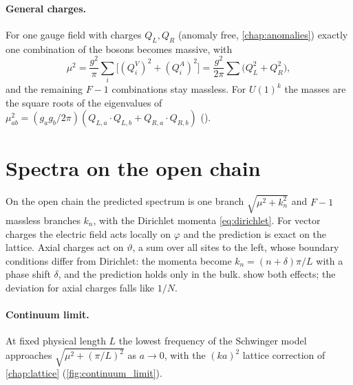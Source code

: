 \paragraph{General charges.} For one gauge field with charges $Q_L,Q_R$ (anomaly free, \cref{chap:anomalies})
exactly one combination of the bosons becomes massive, with
\begin{equation}\label{eq:meson-mass}
  \mu^2 = \frac{g^2}{\pi}\sum_i\bigl[(Q^V_i)^2 + (Q^A_i)^2\bigr] = \frac{g^2}{2\pi}\sum\bigl(Q_L^2 + Q_R^2\bigr),
\end{equation}
and the remaining $F-1$ combinations stay massless. For $U(1)^k$ the masses are the square roots of the
eigenvalues of $\mu^2_{ab} = (g_ag_b/2\pi)(Q_{L,a}\cdot Q_{L,b} + Q_{R,a}\cdot Q_{R,b})$
().

\section{Spectra on the open chain}
On the open chain the predicted spectrum is one branch $\sqrt{\mu^2 + k_n^2}$ and $F-1$ massless branches $k_n$,
with the Dirichlet momenta \eqref{eq:dirichlet}. For vector charges the electric field acts locally on $\varphi$
and the prediction is exact on the lattice. Axial charges act on $\vartheta$, a sum over all sites to the left,
whose boundary conditions differ from Dirichlet: the momenta become $k_n = (n+\delta)\pi/L$ with a phase shift
$\delta$, and the prediction holds only in the bulk.  show
both effects; the deviation for axial charges falls like $1/N$.


\paragraph{Continuum limit.} At fixed physical length $L$ the lowest frequency of the Schwinger model approaches
$\sqrt{\mu^2 + (\pi/L)^2}$ as $a\to0$, with the $(ka)^2$ lattice correction of \cref{chap:lattice}
(\cref{fig:continuum_limit}).


